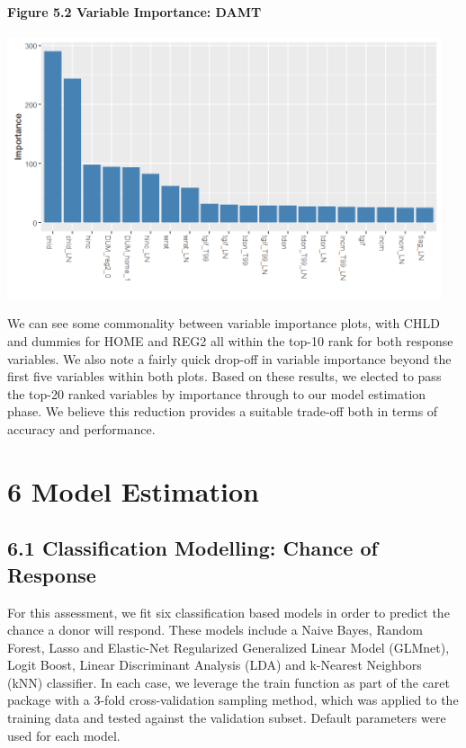 \documentclass[]{article}
\let\oldparagraph\paragraph
\renewcommand{\paragraph}[1]{\oldparagraph{#1}\mbox{}}
\begin{document}
\paragraph{Figure 5.2 Variable Importance:
DAMT}\label{figure-5.2-variable-importance-damt}

\includegraphics[height=3.02083in]{images/varimp_amt.png}

We can see some commonality between variable importance plots, with CHLD
and dummies for HOME and REG2 all within the top-10 rank for both
response variables. We also note a fairly quick drop-off in variable
importance beyond the first five variables within both plots. Based on
these results, we elected to pass the top-20 ranked variables by
importance through to our model estimation phase. We believe this
reduction provides a suitable trade-off both in terms of accuracy and
performance.

\section{6 Model Estimation}\label{model-estimation}

\subsection{6.1 Classification Modelling: Chance of
Response}\label{classification-modelling-chance-of-response}

For this assessment, we fit six classification based models in order to
predict the chance a donor will respond. These models include a Naive
Bayes, Random Forest, Lasso and Elastic-Net Regularized Generalized
Linear Model (GLMnet), Logit Boost, Linear Discriminant Analysis (LDA)
and k-Nearest Neighbors (kNN) classifier. In each case, we leverage the
train function as part of the caret package with a 3-fold
cross-validation sampling method, which was applied to the training data
and tested against the validation subset. Default parameters were used
for each model.
\end{document}
